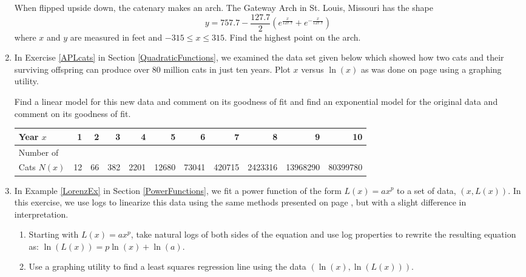 \begin{enumerate}
When flipped upside down, the catenary makes an arch.  The Gateway Arch in St. Louis, Missouri has the shape \[y = 757.7 - \frac{127.7}{2}\left(e^{\frac{x}{127.7}} + e^{-\frac{x}{127.7}}\right)\] where $x$ and $y$ are measured in feet and $-315 \leq x \leq 315$.  Find the highest point on the arch.

\item \label{APLcatsrevisited} In Exercise \ref{APLcats} in Section \ref{QuadraticFunctions}, we examined the data set given below which showed how two cats and their surviving offspring can produce over 80 million cats in just ten years. Plot $x$ versus $\ln(x)$ as was done on page \pageref{swineflulinearized} using a graphing utility.  

Find a linear model for this new data and comment on its goodness of fit and  find an exponential model for the original data and comment on its goodness of fit.

\medskip

\small

\noindent \begin{tabular}{|l|r|r|r|r|r|r|r|r|r|r|} \hline
Year $x$ & 1 & 2 & 3 & 4 & 5 & 6 & 7 & 8 & 9 & 10 \\ 
\hline 
Number of  & & & & & & & & & & \\
Cats $N(x)$ & 12 & 66 & 382 & 2201 & 12680 & 73041 & 420715 & 2423316 & 13968290 & 80399780 \\ \hline
\end{tabular}

\normalsize

\item \label{LorenzExFollowUp} In Example \ref{LorenzEx} in Section \ref{PowerFunctions}, we fit a power function of the form $L(x) = a x^{p}$ to a set of data, $(x, L(x))$.  In this exercise, we use logs to linearize this data using the same methods presented on page \pageref{swineflulinearized}, but with a slight difference in interpretation.

\begin{enumerate}

\item  Starting with $L(x) = a x^{p}$, take natural logs of both sides of the equation and use log properties to rewrite the resulting equation as:  $\ln(L(x)) = p \ln(x) + \ln(a)$.  

\item  Use a graphing utility to find a least squares regression line using the data $(\ln(x), \ln(L(x)))$.   


\end{enumerate}
\end{enumerate}
